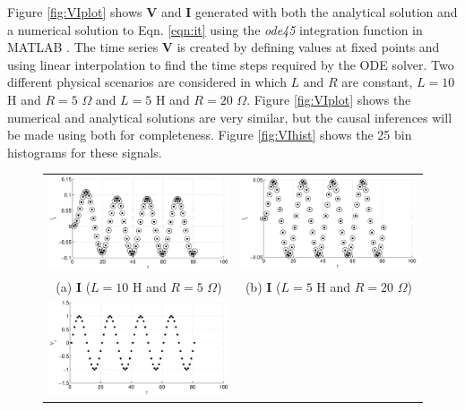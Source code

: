 \documentclass{article}[10pt]
\begin{document}
Figure \ref{fig:VIplot} shows $\mathbf{V}$ and $\mathbf{I}$ generated with both the analytical solution and a numerical solution to Eqn. \ref{eqn:it} using the {\em ode45} integration function in {\sc MATLAB }.  The time series $\mathbf{V}$ is created by defining values at fixed points and using linear interpolation to find the time steps required by the ODE solver.  Two different physical scenarios are considered in which $L$ and $R$ are constant, $L=10$ H and $R=5$ $\Omega$ and $L=5$ H and $R=20$ $\Omega$.  Figure \ref{fig:VIplot} shows the numerical and analytical solutions are very similar, but the causal inferences will be made using both for completeness.  Figure \ref{fig:VIhist} shows the 25 bin histograms for these signals. 
\begin{figure}[ht]
\begin{center}
\begin{tabular}{cc}
\includegraphics[scale=0.48]{IRCircuitResponseExampleL10R5_Y.eps} &
\includegraphics[scale=0.48]{IRCircuitResponseExampleL5R20_Y.eps} \\
(a) $\mathbf{I}$ ($L=10$ H and $R=5$ $\Omega$) & (b) $\mathbf{I}$ ($L=5$ H and $R=20$ $\Omega$)\\
\includegraphics[scale=0.48]{IRCircuitResponseExampleL10R5_X.eps} \\

\end{tabular}
\end{center}
\end{figure}
\end{document}
